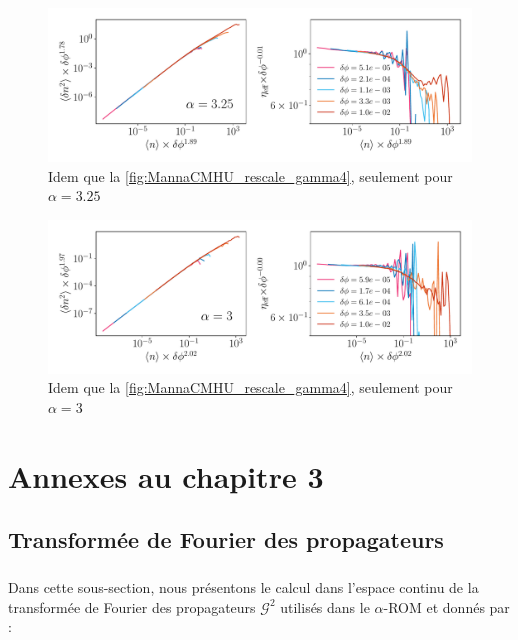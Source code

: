 \begin{figure}[H]
	\centering
	\includegraphics[width=\textwidth]{Chapitre2/Figures/Hyperuniformity/RescaleHU_MannaCM_Gamma325.pdf}
	\caption{Idem que la \autoref{fig:MannaCMHU_rescale_gamma4}, seulement pour $\alpha=3.25$}
	\label{fig:MannaCMHU_rescale_gamma325}
\end{figure}

\begin{figure}[H]
	\centering
	\includegraphics[width=\textwidth]{Chapitre2/Figures/Hyperuniformity/RescaleHU_MannaCM_Gamma3.pdf}
	\caption{Idem que la \autoref{fig:MannaCMHU_rescale_gamma4}, seulement pour $\alpha=3$}
	\label{fig:MannaCMHU_rescale_gamma3}
\end{figure}

\FloatBarrier

\section{Annexes au chapitre 3}

\subsection{Transformée de Fourier des propagateurs}

\label{sec:TFinverse_susp}

\subparagraph{}Dans cette sous-section, nous présentons le calcul dans l'espace continu de la transformée de Fourier des propagateurs $\mathcal{G}^2$ utilisés dans le $\alpha$-ROM et donnés par :

